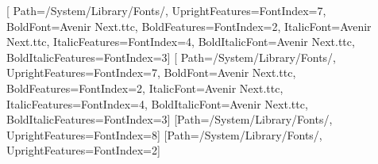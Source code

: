 \usepackage{fontspec}
\usepackage{xcolor}
\usepackage{graphicx}
\usepackage{tikz}
\usetikzlibrary{positioning,fit,backgrounds,arrows.meta,calc,shapes.misc}

\setmainfont{Avenir Next.ttc}[
  Path=/System/Library/Fonts/,
  UprightFeatures={FontIndex=7},
  BoldFont={Avenir Next.ttc}, BoldFeatures={FontIndex=2},
  ItalicFont={Avenir Next.ttc}, ItalicFeatures={FontIndex=4},
  BoldItalicFont={Avenir Next.ttc}, BoldItalicFeatures={FontIndex=3}]
\setsansfont{Avenir Next.ttc}[
  Path=/System/Library/Fonts/,
  UprightFeatures={FontIndex=7},
  BoldFont={Avenir Next.ttc}, BoldFeatures={FontIndex=2},
  ItalicFont={Avenir Next.ttc}, ItalicFeatures={FontIndex=4},
  BoldItalicFont={Avenir Next.ttc}, BoldItalicFeatures={FontIndex=3}]
\newfontfamily{}[Path=/System/Library/Fonts/, UprightFeatures={FontIndex=8}]
\newfontfamily{}[Path=/System/Library/Fonts/, UprightFeatures={FontIndex=2}]


\newcommand{\laile}{Laile ({\cjk 莱乐})}
\newcommand{\lele}{Lele ({\cjk 乐乐})}
\newcommand{\wordmark}{{\cjk\color{accent}莱乐}}
